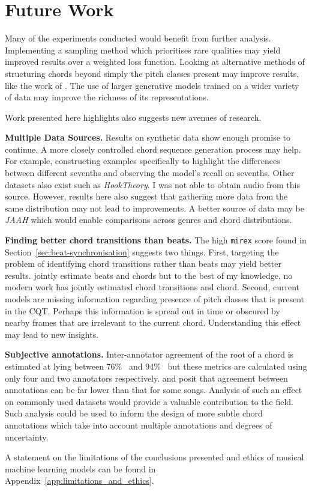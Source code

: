 \section{Future Work}

Many of the experiments conducted would benefit from further analysis. Implementing a sampling method which prioritises rare qualities may yield improved results over a weighted loss function. Looking at alternative methods of structuring chords beyond simply the pitch classes present may improve results, like the work of \citet{ACRLargeVocab1}.  The use of larger generative models trained on a wider variety of data may improve the richness of its representations. 

Work presented here highlights also suggests new avenues of research.

\textbf{Multiple Data Sources.} Results on synthetic data show enough promise to continue. A more closely controlled chord sequence generation process may help. For example, constructing examples specifically to highlight the differences between different sevenths and observing the model's recall on sevenths. Other datasets also exist such as \emph{HookTheory}. I was not able to obtain audio from this source. However, results here also suggest that gathering more data from the same distribution may not lead to improvements. A better source of data may be \emph{JAAH} which would enable comparisons across genres and chord distributions.

\textbf{Finding better chord transitions than beats.} The high \texttt{mirex} score found in Section~\ref{sec:beat-synchronisation} suggests two things. First, targeting the problem of identifying chord transitions rather than beats may yield better results. \citet{ChorusAlignmentJAAH} jointly estimate beats and chords but to the best of my knowledge, no modern work has jointly estimated chord transitions and chord. Second, current models are missing information regarding presence of pitch classes that is present in the CQT. Perhaps this information is spread out in time or obscured by nearby frames that are irrelevant to the current chord. Understanding this effect may lead to new insights.

\textbf{Subjective annotations.} Inter-annotator agreement of the root of a chord is estimated at lying between 76\%~\citep{AnnotatorAgreement76} and 94\%~\citep{RockHarmonyAnalysis94} but these metrics are calculated using only four and two annotators respectively. \citet{FourTimelyInsights} and \citet{UnderstandingSubjectivity} posit that agreement between annotations can be far lower than that for some songs. Analysis of such an effect on commonly used datasets would provide a valuable contribution to the field. Such analysis could be used to inform the design of more subtle chord annotations which take into account multiple annotations and degrees of uncertainty.

A statement on the limitations of the conclusions presented and ethics of musical machine learning models can be found in Appendix~\ref{app:limitations_and_ethics}.

 